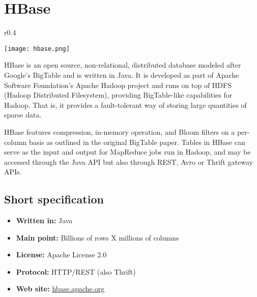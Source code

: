 \chapter{HBase}

\begin{wrapfigure}{r}{0.4\textwidth}
  \vspace{-42pt}
  \begin{center}
    \texttt{[image: hbase.png]}
  \end{center}
  \vspace{-20pt}
\end{wrapfigure}
HBase is an open source, non-relational, distributed database modeled after Google's BigTable and is written in Java. It is developed as part of Apache Software Foundation's Apache Hadoop project and runs on top of HDFS (Hadoop Distributed Filesystem), providing BigTable-like capabilities for Hadoop. That is, it provides a fault-tolerant way of storing large quantities of sparse data.

HBase features compression, in-memory operation, and Bloom filters on a per-column basis as outlined in the original BigTable paper. Tables in HBase can serve as the input and output for MapReduce jobs run in Hadoop, and may be accessed through the Java API but also through REST, Avro or Thrift gateway APIs.

\section{Short specification}

\begin{itemize}
  \item \textbf{Written in:} Java
  \item \textbf{Main point:} Billions of rows X millions of columns
  \item \textbf{License:} Apache License 2.0
  \item \textbf{Protocol:} HTTP/REST (also Thrift)
  \item \textbf{Web site:} \href{http://hbase.apache.org/}{hbase.apache.org}
\end{itemize}